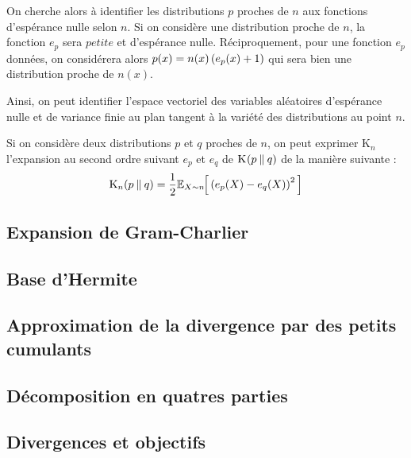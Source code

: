 \documentclass[a4paper]{article}
\newcommand{\Kl}[3][]{\mathrm K_{#1}\!\zp{#2\:\|\:#3}}
\begin{document}
On cherche alors à identifier les distributions $p$ proches de $n$ aux  fonctions d'espérance nulle selon $n$.
Si on considère une distribution proche de $n$, la fonction $e_p$ sera $petite$ et d'espérance nulle. Réciproquement, pour une fonction $e_p$ données, on considérera alors $p(x)=n(x)\zp{e_p(x)+1}$ qui sera bien une distribution proche de $n(x)$.

Ainsi, on peut identifier l'espace vectoriel des variables aléatoires d'espérance nulle et de variance finie au plan tangent à la variété des distributions au point $n$.
\znl

Si on considère deux distributions $p$ et $q$ proches de $n$, on peut exprimer $\mathrm{K}_n$ l'expansion au second ordre suivant $e_p$ et $e_q$ de $\Kl pq$ de la manière suivante :\begin{equation}
  \Kl[n]pq = \frac 12 \zesp[X\sim n]{\zp{e_p(X)-e_q(X)}^2}
\end{equation}

\subsection{Expansion de Gram-Charlier}


\subsection{Base d'Hermite}
\subsection{Approximation de la divergence par des petits cumulants}
\subsection{Décomposition en quatres parties}
\subsection{Divergences et objectifs}



{}
\nocite{*}

\label{lastpage}
\end{document}
